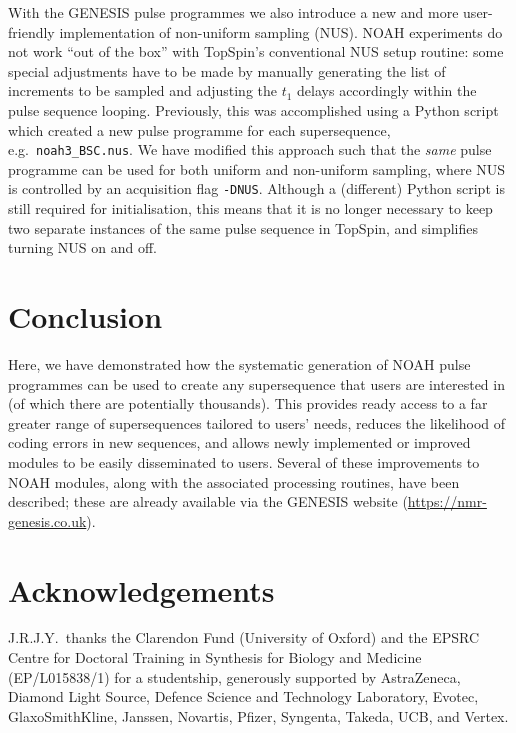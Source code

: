 \documentclass[a4paper,11pt]{article}
\newcommand{\theurl}{\url{https://nmr-genesis.co.uk}}
\begin{document}
\begin{refsection}
With the GENESIS pulse programmes we also introduce a new and more user-friendly implementation of non-uniform sampling (NUS).
NOAH experiments do not work ``out of the box'' with TopSpin's conventional NUS setup routine: some special adjustments have to be made by manually generating the list of increments to be sampled and adjusting the \(t_1\) delays accordingly within the pulse sequence looping.
Previously, this was accomplished using a Python script which created a new pulse programme for each supersequence, e.g.\ \texttt{noah3\_BSC.nus}.\autocite{Claridge2019MRC}
We have modified this approach such that the \textit{same} pulse programme can be used for both uniform and non-uniform sampling, where NUS is controlled by an acquisition flag \texttt{-DNUS}.
Although a (different) Python script is still required for initialisation, this means that it is no longer necessary to keep two separate instances of the same pulse sequence in TopSpin, and simplifies turning NUS on and off.


\section{Conclusion}

Here, we have demonstrated how the systematic generation of NOAH pulse programmes can be used to create any supersequence that users are interested in (of which there are potentially thousands).
This provides ready access to a far greater range of supersequences tailored to users' needs, reduces the likelihood of coding errors in new sequences, and allows newly implemented or improved modules to be easily disseminated to users.
Several of these improvements to NOAH modules, along with the associated processing routines, have been described; these are already available via the GENESIS website (\theurl{}).

\section*{Acknowledgements}

J.R.J.Y.\ thanks the Clarendon Fund (University of Oxford) and the EPSRC Centre for Doctoral Training in Synthesis for Biology and Medicine (EP/L015838/1) for a studentship, generously supported by AstraZeneca, Diamond Light Source, Defence Science and Technology Laboratory, Evotec, GlaxoSmithKline, Janssen, Novartis, Pfizer, Syngenta, Takeda, UCB, and Vertex.

\printbibliography{}
\end{refsection}
\end{document}
